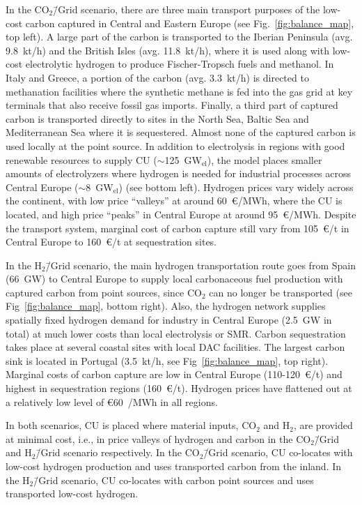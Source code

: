 \documentclass[twocolumn]{article}
\newcommand{\carbon}{CO$_2$}
\newcommand{\hydrogen}{H$_2$}
\newcommand{\carbongrid}{CO$_2$\=/Grid}
\newcommand{\carbonscenario}{CO$_2$\=/Grid scenario}
\newcommand{\hydrogenscenario}{H$_2$\=/Grid scenario}
\begin{document}
In the \carbonscenario, there are three main transport purposes of the low-cost carbon captured in Central and Eastern Europe (see Fig.~\ref{fig:balance_map}, top left). A large part of the carbon is transported to the Iberian Peninsula (avg. 9.8~kt/h) and the British Isles (avg. 11.8~kt/h), where it is used along with low-cost electrolytic hydrogen to produce Fischer-Tropsch fuels and methanol. In Italy and Greece, a portion of the carbon (avg. 3.3~kt/h) is directed to methanation facilities where the synthetic methane is fed into the gas grid at key terminals that also receive fossil gas imports. Finally, a third part of captured carbon is transported directly to sites in the North Sea, Baltic Sea and Mediterranean Sea where it is sequestered. Almost none of the captured carbon is used locally at the point source. In addition to electrolysis in regions with good renewable resources to supply CU ($\sim$125~GW$_\text{el}$), the model places smaller amounts of electrolyzers where hydrogen is needed for industrial processes across Central Europe ($\sim$8~GW$_\text{el}$) (see bottom left). Hydrogen prices vary widely across the continent, with low price ``valleys'' at around 60~€/MWh, where the CU is located, and high price ``peaks'' in Central Europe at around 95~€/MWh. Despite the transport system, marginal cost of carbon capture still vary from 105~€/t in Central Europe to 160~€/t at sequestration sites.

In the \hydrogenscenario{}, the main hydrogen transportation route goes from Spain (66~GW) to Central Europe to supply local carbonaceous fuel production with captured carbon from point sources, since \carbon{} can no longer be transported (see Fig~\ref{fig:balance_map}, bottom right). Also, the hydrogen network supplies spatially fixed hydrogen demand for industry in Central Europe (2.5~GW in total) at much lower costs than local electrolysis or SMR. Carbon sequestration takes place at several coastal sites with local DAC facilities. The largest carbon sink is located in Portugal (3.5~kt/h, see Fig~\ref{fig:balance_map}, top right). Marginal costs of carbon capture are low in Central Europe (110-120~€/t) and highest in sequestration regions (160~€/t). Hydrogen prices have flattened out at a relatively low level of €60~/MWh in all regions.

In both scenarios, CU is placed where material inputs, \carbon{} and \hydrogen{}, are provided at minimal cost, i.e., in price valleys of hydrogen and carbon in the \carbongrid{} and \hydrogenscenario{} respectively. In the \carbonscenario{}, CU co-locates with low-cost hydrogen production and uses transported carbon from the inland. In the \hydrogenscenario{}, CU co-locates with carbon point sources and uses transported low-cost hydrogen.
\end{document}
